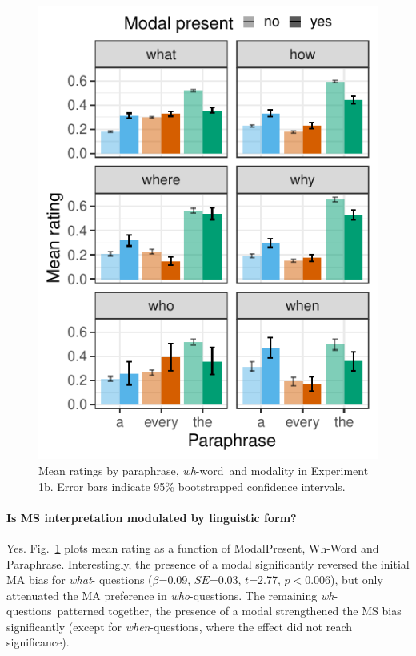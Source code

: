 \documentclass[12pt,letterpaper,table,svgnames,dvipsnames]{article}
\newcommand{\figref}[1]{Fig.~\ref{#1}}
\newcommand{\whqs}{\emph{wh}-questions~}
\newcommand{\whw}{\emph{wh}-word~}
\begin{document}
\begin{figure}[h!]
\centering
\includegraphics[scale=1]{figures/modxwh_eq_context.pdf}
\caption{Mean ratings by paraphrase, \whw and modality in Experiment 1b. Error bars indicate 95\% bootstrapped confidence intervals.} 
\label{ex1b_modXwh}
\end{figure}

\paragraph{Is MS interpretation modulated by linguistic form?}
Yes. \figref{ex1b_modXwh} plots mean rating as a function of ModalPresent, Wh-Word and Paraphrase. Interestingly, the presence of a modal significantly reversed the initial MA bias for \emph{what}- questions ($\beta$=0.09, $SE$=0.03, $t$=2.77, $p<$0.006), but only attenuated the MA preference in \emph{who}-questions. The remaining \whqs patterned together, the presence of a modal strengthened the MS bias significantly (except for \emph{when}-questions, where the effect did not reach significance).
\end{document}

